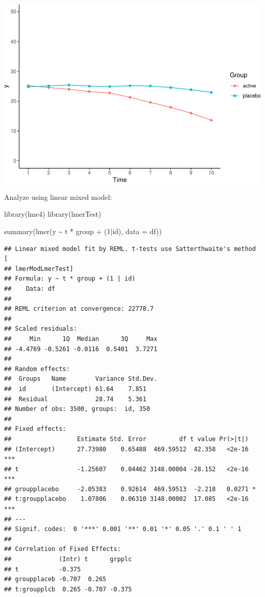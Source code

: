 \documentclass[
]{book}
\newenvironment{Shaded}{\begin{snugshade}}{\end{snugshade}}
\newcommand{\AttributeTok}[1]{\textcolor[rgb]{0.77,0.63,0.00}{#1}}
\newcommand{\DecValTok}[1]{\textcolor[rgb]{0.00,0.00,0.81}{#1}}
\newcommand{\FunctionTok}[1]{\textcolor[rgb]{0.00,0.00,0.00}{#1}}
\newcommand{\NormalTok}[1]{#1}
\newcommand{\SpecialCharTok}[1]{\textcolor[rgb]{0.00,0.00,0.00}{#1}}
\begin{document}
\includegraphics{DZP_R_bookdown_files/figure-latex/unnamed-chunk-28-1.pdf}

Analyze using linear mixed model:

\begin{Shaded}
\begin{Highlighting}[]
\FunctionTok{library}\NormalTok{(lme4)}
\FunctionTok{library}\NormalTok{(lmerTest)}

\FunctionTok{summary}\NormalTok{(}\FunctionTok{lmer}\NormalTok{(y }\SpecialCharTok{\textasciitilde{}}\NormalTok{ t }\SpecialCharTok{*}\NormalTok{ group }\SpecialCharTok{+}\NormalTok{ (}\DecValTok{1}\SpecialCharTok{|}\NormalTok{id), }\AttributeTok{data =}\NormalTok{ df))}
\end{Highlighting}
\end{Shaded}

\begin{verbatim}
## Linear mixed model fit by REML. t-tests use Satterthwaite's method [
## lmerModLmerTest]
## Formula: y ~ t * group + (1 | id)
##    Data: df
## 
## REML criterion at convergence: 22778.7
## 
## Scaled residuals: 
##     Min      1Q  Median      3Q     Max 
## -4.4769 -0.5261 -0.0116  0.5401  3.7271 
## 
## Random effects:
##  Groups   Name        Variance Std.Dev.
##  id       (Intercept) 61.64    7.851   
##  Residual             28.74    5.361   
## Number of obs: 3500, groups:  id, 350
## 
## Fixed effects:
##                  Estimate Std. Error         df t value Pr(>|t|)    
## (Intercept)      27.73980    0.65488  469.59512  42.358   <2e-16 ***
## t                -1.25607    0.04462 3148.00004 -28.152   <2e-16 ***
## groupplacebo     -2.05383    0.92614  469.59513  -2.218   0.0271 *  
## t:groupplacebo    1.07806    0.06310 3148.00002  17.085   <2e-16 ***
## ---
## Signif. codes:  0 '***' 0.001 '**' 0.01 '*' 0.05 '.' 0.1 ' ' 1
## 
## Correlation of Fixed Effects:
##             (Intr) t      grpplc
## t           -0.375              
## groupplaceb -0.707  0.265       
## t:groupplcb  0.265 -0.707 -0.375
\end{verbatim}
\end{document}
